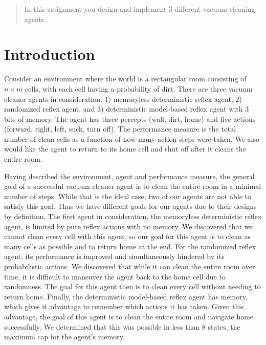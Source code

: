 \documentclass[12pt]{article}
\begin{document}
\maketitle

\begin{abstract}
In this assignment you design and implement 3 different vacuum-cleaning agents.
\end{abstract}

\section{Introduction}

Consider an environment where the world is a rectangular room consisting of $ n \times m $ cells, with each cell having a probability of dirt. There are three vacuum cleaner agents in consideration: 1) memoryless deterministic reflex agent, 2) randomized reflex agent, and 3) deterministic model-based reflex agent with 3 bits of memory. The agent has three percepts (wall, dirt, home) and five actions (forward, right, left, suck, turn off). The performance measure is the total number of clean cells as a function of how many action steps were taken. We also would like the agent to return to its home cell and shut off after it cleans the entire room.

Having described the environment, agent and performance measure, the general goal of a successful vacuum cleaner agent is to clean the entire room in a minimal number of steps. While that is the ideal case, two of our agents are not able to satisfy this goal. Thus we have different goals for our agents due to their designs by definition. The first agent in consideration, the memoryless deterministic reflex agent, is limited by pure reflex actions with no memory. We discovered that we cannot clean every cell with this agent, so our goal for this agent is to clean as many cells as possible and to return home at the end. For the randomized reflex agent, its performance is improved and simultaneously hindered by its probabilistic actions. We discovered that while it can clean the entire room over time, it is difficult to maneuver the agent back to the home cell due to randomness. The goal for this agent then is to clean every cell without needing to return home. Finally, the deterministic model-based reflex agent has memory, which gives it advantage to remember which actions it has taken. Given this advantage, the goal of this agent is to clean the entire room and navigate home successfully. We determined that this was possible in less than 8 states, the maximum cap for the agent's memory.
\end{document}
